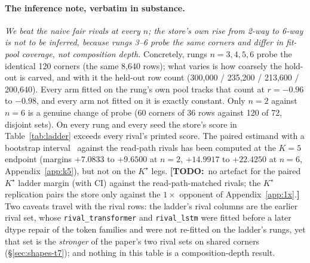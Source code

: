 \documentclass{article} %
\newcommand{\TODO}[1]{{\color{orange}\textbf{[TODO:}~#1\textbf{]}}}
\newcommand{\Kstar}{\ensuremath{K^{\star}}}
\begin{document}
\paragraph{The inference note, verbatim in substance.} \emph{We beat the naive fair rivals at
every $n$; the store's own rise from 2-way to 6-way is not to be inferred, because rungs 3--6
probe the same corners and differ in fit-pool coverage, not composition depth.} Concretely,
rungs $n=3,4,5,6$ probe the identical 120 corners (the same 8,640 rows); what varies is how
coarsely the hold-out is carved, and with it the held-out row count (300,000 / 235,200 /
213,600 / 200,640). Every arm fitted on the rung's own pool tracks that count at
$r=-0.96$ to $-0.98$, and every arm not fitted on it is exactly constant.
Only $n=2$ against $n=6$ is a genuine change of probe (60 corners of 36 rows against 120 of
72, disjoint sets). %
On every rung and every seed the store's score in Table~\ref{tab:ladder} exceeds every
rival's printed score. The paired estimand with a bootstrap interval~\citep{efron1979bootstrap} against the read-path
rivals has been computed at the $K=5$ endpoint (margins $+7.0833$ to $+9.6500$ at $n=2$,
$+14.9917$ to $+22.4250$ at $n=6$, Appendix~\ref{app:k5}), but not on the $\Kstar$ legs.
\TODO{no artefact for the paired $\Kstar$ ladder margin (with CI) against the read-path-matched
rivals; the $\Kstar$ replication pairs the store only against the $1\times$ opponent of
Appendix~\ref{app:1x}.}
Two caveats travel with the rival rows: the ladder's rival columns are the earlier rival set,
whose \texttt{rival\_transformer} and \texttt{rival\_lstm} were fitted before a later dtype repair of
the token families and were not re-fitted on the ladder's rungs, yet that set is the
\emph{stronger} of the paper's two rival sets on shared corners (\S\ref{sec:shapes-t7}); and
nothing in this table is a composition-depth result.
\end{document}
